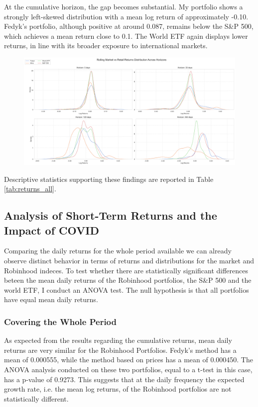 At the cumulative horizon, the gap becomes substantial. My portfolio shows a strongly left-skewed distribution with a mean log return of approximately -0.10.
Fedyk’s portfolio, although positive at around 0.087, remains below the S\&P 500, which achieves a mean return close to 0.1. 
The World ETF again displays lower returns, in line with its broader exposure to international markets.
\begin{figure}[h!]
    \centering
    \includegraphics[width=1\linewidth]
    {../images/distributions/comparison_2.png}
\end{figure}

Descriptive statistics supporting these findings are reported in Table \ref{tab:returns_all}.

\subsection{Analysis of Short-Term Returns and the Impact of COVID}
Comparing the daily returns for the whole period available we can already observe distinct behavior in terms of returns and distributions for the market and Robinhood indeces.
To test whether there are statistically significant differences beteen the mean daily returns of the Robinhood portfolios, the S\&P 500 and the world ETF, I conduct an ANOVA test.
The null hypothesis is that all portfolios have equal mean daily returns.

\subsubsection{Covering the Whole Period}
As expected from the results regarding the cumulative returns, mean daily returns are very similar for the Robinhood Portfolios.
Fedyk's method has a mean of 0.000555, while the method based on prices has a mean of 0.000450.
The ANOVA analysis conducted on these two portfolios, equal to a t-test in this case, has a p-value of 0.9273.
This suggests that at the daily frequency the expected growth rate, i.e. the mean log returns, of the Robinhood portfolios are not statistically different.


